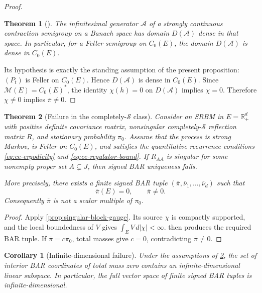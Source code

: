 \documentclass[aihp]{imsart}
\numberwithin{equation}{section}
\theoremstyle{plain}
\newtheorem{theorem}{Theorem}[section]
\newtheorem{corollary}[corollary]{Corollary}
\theoremstyle{definition}
\newcommand{\1}{\mathbf 1}
\begin{document}
\begin{proof}
\begin{theorem}[{\normalfont\cite[Chapter~1, Section~2]{EthierKurtz1986}}]
 The infinitesimal generator $\mathcal A$ of a strongly continuous contraction semigroup on a Banach space has domain $D(\mathcal A)$ dense in that space. In particular, for a Feller semigroup on $C_0(E)$, the domain $D(\mathcal A)$ is dense in $C_0(E)$.    
\end{theorem}



Its hypothesis is exactly the standing assumption of the present proposition: $(P_t)$ is Feller on $C_0(E)$. Hence $D(\mathcal A)$ is dense in $C_0(E)$.  Since \(\mathcal M(E)=C_0(E)^*\), the identity \(\chi(h)=0\) on \(D(\mathcal A)\) implies \(\chi=0\). Therefore \(\chi\ne0\) implies \(\overline\pi\ne0\).
\end{proof}

\begin{theorem}[Failure in the completely-$\mathcal{S}$ class]\label{thm:singular-block-obstruction}
Consider an SRBM in $E=\mathbb R_+^d$ with positive definite covariance matrix, nonsingular completely-$\mathcal{S}$ reflection matrix $R$, and stationary probability $\pi_0$. Assume that the process is strong Markov, is Feller on \(C_0(E)\), and satisfies the quantitative recurrence conditions \eqref{eq:ce-ergodicity} and \eqref{eq:ce-regulator-bound}. If $R_{AA}$ is singular for some nonempty proper set $A\subsetneq J$, then signed BAR uniqueness fails.

More precisely, there exists a finite signed BAR tuple $(\overline\pi,\overline\nu_1,\ldots,\overline\nu_d)$ such that
\begin{equation}\label{eq:ce-nontrivial-zero-mass}
 \overline\pi(E)=0,
 \qquad
 \overline\pi\ne0.
\end{equation}
Consequently $\overline\pi$ is not a scalar multiple of $\pi_0$.
\end{theorem}

\begin{proof}
Apply \cref{prop:singular-block-gauge}. Its source $\chi$ is compactly supported, and the local boundedness of $V$ gives $\int_E V\,d|\chi|<\infty$.  then produces the required BAR tuple. If $\overline\pi=c\pi_0$, total masses give $c=0$, contradicting $\overline\pi\ne0$.
\end{proof}

\begin{corollary}[Infinite-dimensional failure]\label{cor:infinite-dimensional-failure}
Under the assumptions of \cref{thm:singular-block-obstruction}, the set of interior BAR coordinates of total mass zero contains an infinite-dimensional linear subspace. In particular, the full vector space of finite signed BAR tuples is infinite-dimensional.
\end{corollary}
\end{document}

